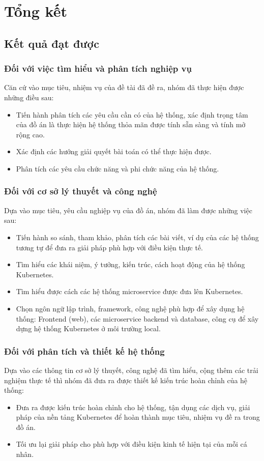 \chapter{Tổng kết}
\section{Kết quả đạt được}
\subsection{Đối với việc tìm hiểu và phân tích nghiệp vụ}
\noindent Căn cứ vào mục tiêu, nhiệm vụ của đề tài đã đề ra, nhóm đã thực hiện được những điều sau:
\begin{itemize}
    \item Tiến hành phân tích các yêu cầu cần có của hệ thống, xác định trọng tâm của đồ án là thực hiện hệ thống thỏa mãn được tính sẵn sàng và tính mở rộng cao.
    \item Xác định các hướng giải quyết bài toán có thể thực hiện được.
    \item Phân tích các yêu cầu chức năng và phi chức năng của hệ thống.
\end{itemize}

\subsection{Đối với cơ sở lý thuyết và công nghệ}
\noindent Dựa vào mục tiêu, yêu cầu nghiệp vụ của đồ án, nhóm đã làm được những việc sau:
\begin{itemize}
    \item Tiến hành so sánh, tham khảo, phân tích các bài viết, ví dụ của các hệ thống tương tự để đưa ra giải pháp phù hợp với điều kiện thực tế.
    \item Tìm hiểu các khái niệm, ý tưởng, kiến trúc, cách hoạt động của hệ thống Kubernetes.
    \item Tìm hiểu được cách các hệ thống microservice được đưa lên Kubernetes.
    \item Chọn ngôn ngữ lập trình, framework, công nghệ phù hợp để xây dụng hệ thống: Frontend (web), các microservice backend và database, công cụ để xây dựng hệ thống Kubernetes ở môi trường local.
\end{itemize}
\subsection{Đối với phân tích và thiết kế hệ thống}
\noindent Dựa vào các thông tin cơ sở lý thuyết, công nghệ đã tìm hiểu, cộng thêm các trải nghiệm thực tế thì nhóm đã đưa ra được thiết kế kiến trúc hoàn chỉnh của hệ thống:
\begin{itemize}
    \item Đưa ra được kiến trúc hoàn chỉnh cho hệ thống, tận dụng các dịch vụ, giải pháp của nền tảng Kubernetes để hoàn thành mục tiêu, nhiệm vụ đề ra trong đồ án.
    \item Tối ưu lại giải pháp cho phù hợp với điều kiện kinh tế hiện tại của mỗi cá nhân.
\end{itemize}

